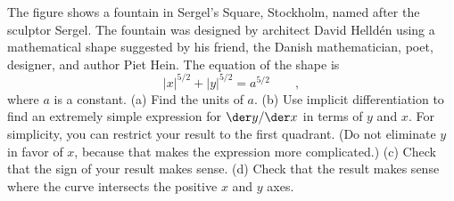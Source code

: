 The figure shows a fountain in Sergel's Square, Stockholm, named after
the sculptor Sergel. The fountain was designed by 
architect David Helld\'en using a mathematical shape suggested by his friend,
the Danish mathematician,
poet, designer, and author Piet Hein. The equation of the shape is
\begin{equation*}
  |x|^{5/2}+|y|^{5/2} = a^{5/2} \qquad ,
\end{equation*}
where $a$ is a constant.
(a) Find the units of $a$.
(b) Use implicit differentiation to find
an extremely simple expression for  $\der y/\der x$ in terms of $y$ and $x$.
For simplicity, you can restrict your result to the first quadrant.
(Do not eliminate $y$ in favor of $x$, because that makes the expression more complicated.)
(c) Check that the sign of your result makes sense.
(d) Check that the result makes sense where the curve intersects the positive
$x$ and $y$ axes.
